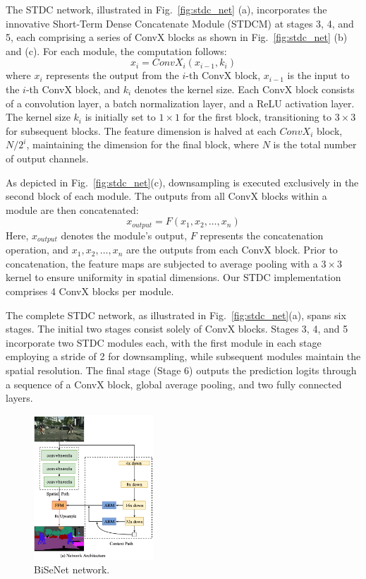 \documentclass[conference]{IEEEtran}
\begin{document}
The STDC network, illustrated in Fig.~\ref{fig:stdc_net} (a), incorporates the innovative Short-Term Dense Concatenate Module (STDCM) at stages 3, 4, and 5, each comprising a series of ConvX blocks as shown in Fig.~\ref{fig:stdc_net} (b) and (c). For each module, the computation follows:
\begin{equation}
x_i = ConvX_i(x_{i-1}, k_i)
\end{equation}
where $x_i$ represents the output from the $i$-th ConvX block, $x_{i-1}$ is the input to the $i$-th ConvX block, and $k_i$ denotes the kernel size. Each ConvX block consists of a convolution layer, a batch normalization layer, and a ReLU activation layer. The kernel size $k_i$ is initially set to $1 \times 1$ for the first block, transitioning to $3 \times 3$ for subsequent blocks. The feature dimension is halved at each $ConvX_i$ block, $N/2^i$, maintaining the dimension for the final block, where $N$ is the total number of output channels.

As depicted in Fig.~\ref{fig:stdc_net}(c), downsampling is executed exclusively in the second block of each module. The outputs from all ConvX blocks within a module are then concatenated:
\begin{equation}
x_{output} = F(x_1, x_2, \dots, x_n)
\end{equation}
Here, $x_{output}$ denotes the module's output, $F$ represents the concatenation operation, and $x_1, x_2, \dots, x_n$ are the outputs from each ConvX block. Prior to concatenation, the feature maps are subjected to average pooling with a $3 \times 3$ kernel to ensure uniformity in spatial dimensions. Our STDC implementation comprises 4 ConvX blocks per module.

The complete STDC network, as illustrated in Fig.~\ref{fig:stdc_net}(a), spans six stages. The initial two stages consist solely of ConvX blocks. Stages 3, 4, and 5 incorporate two STDC modules each, with the first module in each stage employing a stride of 2 for downsampling, while subsequent modules maintain the spatial resolution. The final stage (Stage 6) outputs the prediction logits through a sequence of a ConvX block, global average pooling, and two fully connected layers.

\begin{figure}[tp]
\centerline{\includegraphics[width=0.4\textwidth]{figures/BiSeNet}}
\caption{BiSeNet network.}
\label{fig:bisenet}
\end{figure}
\end{document}
